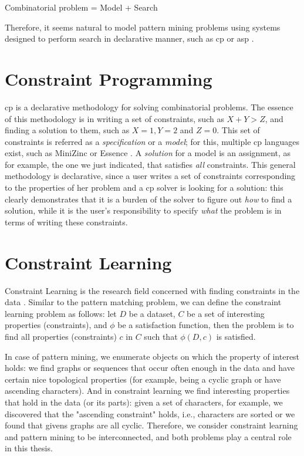 \begin{center}
  Combinatorial problem = Model + Search
\end{center}

Therefore, it seems natural to model pattern mining problems 
using systems designed to perform search in declarative manner, such
as \acrlong{cp} \parencite{handbookcp} or \acrlong{asp}
\parencite{whatisasp}. %

\section{Constraint Programming} 
\acrlong{cp} is a declarative methodology for solving combinatorial
problems. The essence of this methodology is in writing a set of
constraints, such as $X + Y > Z$, and finding a solution to them, such
as $X = 1, Y = 2$ and $Z = 0$. This set of constraints is referred as
a \textit{specification} or a \textit{model}; for this, multiple \acrlong{cp}
languages exist, such as MiniZinc \parencite{minizinc} or Essence
\parencite{essence}. A \textit{solution} for
a model is an assignment, as for example, the one we just indicated, that satisfies
\textit{all} constraints. This general methodology is declarative,
since a user writes a set of constraints corresponding to the
properties of her problem and a \acrshort{cp} solver is looking for a
solution: this clearly demonstrates that it is a burden of the solver
to figure out \textit{how} to find a solution, while it is the user's
responsibility to specify \textit{what} the problem is in terms of
writing these constraints.

\section{Constraint Learning}
Constraint Learning is the research field concerned with finding
constraints in the data \parencite{constraint_learning,QUACQ,Conacq}.
Similar to the pattern matching problem, we can define 
the constraint learning problem as follows:
let $D$ be a dataset, $C$ be a set of interesting properties (constraints), and
$\phi$ be a satisfaction function, 
then the problem is to find all properties (constraints) $c$ in $C$ such that $\phi(D,c)$ is satisfied.

In case of pattern mining, we enumerate objects on which the property
of interest holds: we find graphs or sequences that occur often enough
in the data and have certain nice topological properties (for example, being a
cyclic graph or have ascending characters). And in constraint learning we find interesting
properties that hold in the data (or its parts): given a set of
characters, for example, we discovered that the "ascending constraint" holds, i.e.,
characters are sorted or we found that givens graphs are all cyclic.
Therefore, we consider constraint learning and pattern mining to be interconnected, and both problems play a central role in this thesis.

